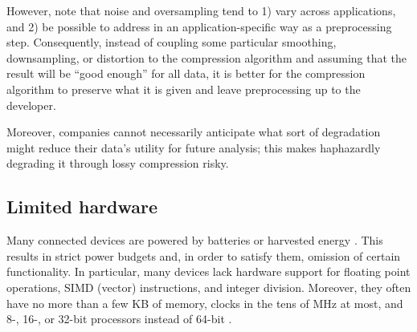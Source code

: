 However, note that noise and oversampling tend to 1) vary across applications, and 2) be possible to address in an application-specific way as a preprocessing step. Consequently, instead of coupling some particular smoothing, downsampling, or distortion to the compression algorithm and assuming that the result will be ``good enough'' for all data, it is better for the compression algorithm to preserve what it is given and leave preprocessing up to the developer.




Moreover, companies cannot necessarily anticipate what sort of degradation might reduce their data's utility for future analysis; this makes haphazardly degrading it through lossy compression risky.

\subsection{Limited hardware}

Many connected devices are powered by batteries or harvested energy \cite{bsnChallenges}. This results in strict power budgets and, in order to satisfy them, omission of certain functionality. In particular, many devices lack hardware support for floating point operations, SIMD (vector) instructions, and integer division. Moreover, they often have no more than a few KB of memory, clocks in the tens of MHz at most, and 8-, 16-, or 32-bit processors instead of 64-bit \cite{cc2540, cc2640, quark}.

